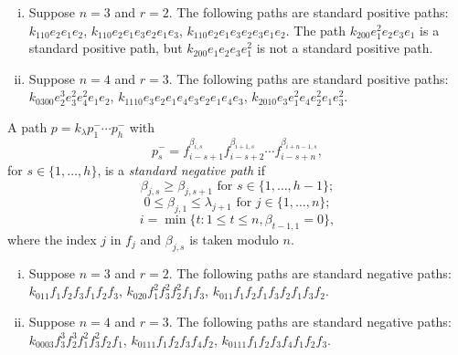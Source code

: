\documentclass[a4paper, 11pt, twoside]{report}
\begin{document}
\begin{example}
\begin{enumerate}[(i)]
\item
Suppose $n=3$ and $r=2$. The following paths are standard positive paths: $k_{110}e_2e_1e_2$, $k_{110}e_2e_1e_3e_2e_1e_3$, $k_{110}e_2e_1e_3e_2e_3e_1e_2$. The path $k_{200}e_1^2e_2e_3e_1$ is a standard positive path, but $k_{200}e_1e_2e_3e_1^2$ is not a standard positive path.

\item
Suppose $n=4$ and $r=3$. The following paths are standard positive paths: $k_{0300}e_2^3e_3^2e_4^2e_1e_2$, $k_{1110}e_3e_2e_1e_4e_3e_2e_1e_4e_3$, $k_{2010}e_3e_1^2e_4e_2^2e_1e_3^2$.
\end{enumerate}
\end{example}

\begin{definition}\label{def:standard-negative-path}
A path $p=k_\lambda p_1^-\cdots p_h^-$ with
\begin{equation*}
p_s^- = f_{i-s+1}^{\beta_{i,s}}f_{i-s+2}^{\beta_{i+1,s}}\cdots f_{i-s+n}^{\beta_{i+n-1,s}},
\end{equation*}
for $s\in\{1,\ldots,h\}$, is a \emph{standard negative path} if
\begin{equation*}
\beta_{j,s}\geq \beta_{j,s+1} \text{ for } s\in\{1,\ldots,h-1\};
\end{equation*}
\begin{equation*}
0\le \beta_{j,1}\le\lambda_{j+1} \text{ for } j\in\{1,\ldots,n\};
\end{equation*}
\begin{equation*}
i = \min\{t:1\le t\le n, \beta_{t-1,1}=0\},
\end{equation*}
where the index $j$ in $f_j$ and $\beta_{j,s}$ is taken modulo $n$.
\end{definition}

\begin{example}
\begin{enumerate}[(i)]
\item
Suppose $n=3$ and $r=2$. The following paths are standard negative paths: $k_{011}f_1f_2f_3f_1f_2f_3$, $k_{020}f_1^2f_3^2f_2^2f_1f_3$, $k_{011}f_1f_2f_1f_3f_2f_1f_3f_2$.

\item
Suppose $n=4$ and $r=3$. The following paths are standard negative paths: $k_{0003}f_3^3f_2^3f_1^2f_3^2f_2f_1$, $k_{0111}f_1f_2f_3f_4f_2$, $k_{0111}f_1f_2f_3f_4f_1f_2f_3$.
\end{enumerate}
\end{example}
\end{document}
